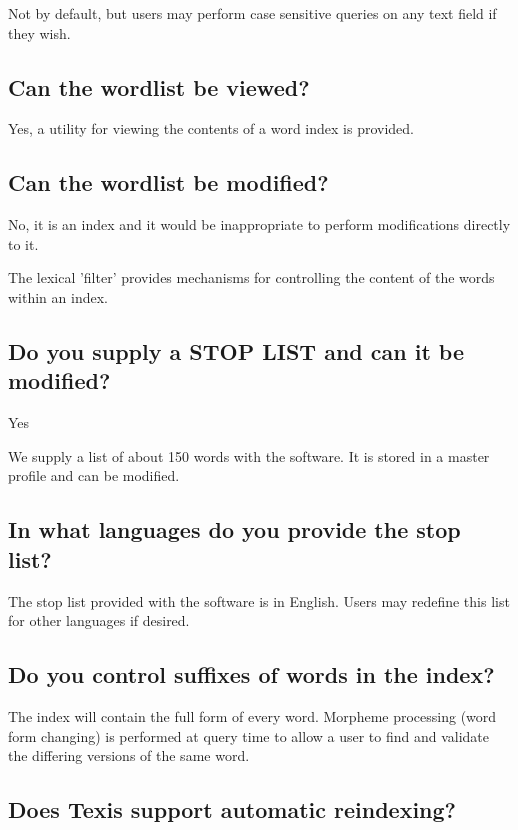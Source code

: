 Not by default, but users may perform case sensitive queries on any
text field if they wish.

\subsection{Can the wordlist be viewed?}

Yes, a utility for viewing the contents of a word index is provided.

\subsection{Can the wordlist be modified?}

No, it is an index and it would be inappropriate to perform modifications
directly to it.

The lexical 'filter' provides mechanisms for controlling the content of
the words within an index.

\subsection{Do you supply a STOP LIST and can it be modified?}

Yes

We supply a list of about 150 words with the software.  It is stored in a
master profile and can be modified.

\subsection{In what languages do you provide the stop list?}

The stop list provided with the software is in English.  Users
may redefine this list for other languages if desired.

\subsection{Do you control suffixes of words in the index?}

The index will contain the full form of every word.  Morpheme processing
(word form changing) is performed at query time to allow a user to find
and validate the differing versions of the same word.

\subsection{Does Texis support automatic reindexing?}

